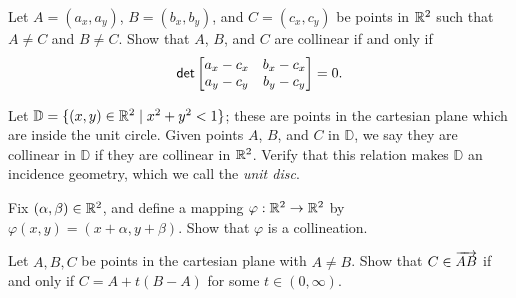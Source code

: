 \begin{exercise}
Let \(A = (a_x,a_y)\), \(B = (b_x,b_y)\), and \(C = (c_x,c_y)\) be points in \(\mathbb{R}^2\) such that \(A \neq C\) and \(B \neq C\).
Show that \(A\), \(B\), and \(C\) are collinear if and only if \[ \mathsf{det} \begin{bmatrix} a_x - c_x & b_x - c_x \\ a_y - c_y & b_y - c_y \end{bmatrix} = 0. \]
\end{exercise}


\begin{exercise}
Let \(\mathbb{D} = \{ (x,y) \in \mathbb{R}^2 \mid x^2 + y^2 < 1 \}\); these are points in the cartesian plane which are inside the unit circle.
Given points \(A\), \(B\), and \(C\) in \(\mathbb{D}\), we say they are collinear in \(\mathbb{D}\) if they are collinear in \(\mathbb{R}^2\).
Verify that this relation makes \(\mathbb{D}\) an incidence geometry, which we call the \emph{unit disc}.
\end{exercise}


\begin{exercise}
Fix \((\alpha,\beta) \in \mathbb{R}^2\), and define a mapping \(\varphi : \mathbb{R}^2 \rightarrow \mathbb{R}^2\) by \(\varphi(x,y) = (x + \alpha, y + \beta)\).
Show that \(\varphi\) is a collineation.
\end{exercise}


\begin{exercise}\label{exerc:rr2-ray-positive}
Let \(A,B,C\) be points in the cartesian plane with \(A \neq B\).
Show that \(C \in \overrightarrow{AB}\) if and only if \(C = A + t(B - A)\) for some \(t \in (0,\infty)\).
\end{exercise}
